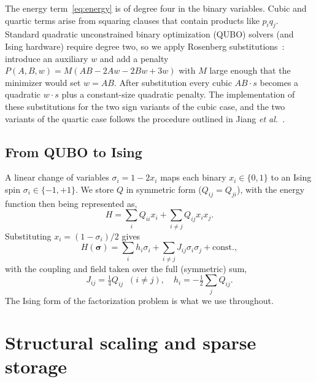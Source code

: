 \documentclass[pdflatex,sn-apa]{sn-jnl}%
\theoremstyle{thmstyleone}%
\theoremstyle{thmstyletwo}%
\theoremstyle{thmstylethree}%
\begin{document}
The energy term~\eqref{eq:energy} is of degree four in the binary variables. Cubic and quartic terms arise from squaring clauses that contain products like $p_i q_j$. Standard quadratic unconstrained binary optimization (QUBO) solvers (and Ising hardware) require degree two, so we apply Rosenberg substitutions~\citep{Rosenberg1975}: introduce an auxiliary $w$ and add a penalty $P(A,B,w) = M(AB - 2Aw - 2Bw + 3w)$ with $M$ large enough that the minimizer would set $w = AB$. After substitution every cubic $AB \cdot s$ becomes a quadratic $w \cdot s$ plus a constant-size quadratic penalty. The implementation of these substitutions for the two sign variants of the cubic case, and the two variants of the quartic case follows the procedure outlined in Jiang \emph{et al.}~\citeyearpar{Jiang2018}.

\subsection{From QUBO to Ising}\label{sec:qubotoising}

A linear change of variables $\sigma_i = 1 - 2 x_i$ maps each binary $x_i \in \{0,1\}$ to an Ising spin $\sigma_i \in \{-1, +1\}$. We store $Q$ in symmetric form ($Q_{ij} = Q_{ji}$), with the energy function then being represented as,
\begin{equation}
  H = \sum_i Q_{ii} x_i + \sum_{i \neq j} Q_{ij} x_i x_j.
\end{equation}
Substituting $x_i = (1 - \sigma_i)/2$ gives
\begin{equation}
  H(\boldsymbol\sigma) = \sum_i h_i \sigma_i
                      + \sum_{i \neq j} J_{ij} \sigma_i \sigma_j
                      + \text{const.},
\end{equation}
with the coupling and field taken over the full (symmetric) sum,
\begin{equation}
  J_{ij} = \tfrac{1}{4} Q_{ij} \;\; (i \neq j), \quad
  h_i    = -\tfrac{1}{2} \sum_{j} Q_{ij}.
\end{equation}
The Ising form of the factorization problem is what we use throughout.

\section{Structural scaling and sparse storage}\label{sec:scaling}
\end{document}
